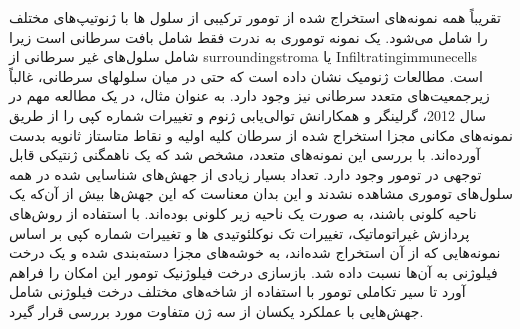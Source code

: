 تقریباً همه نمونه‌های استخراج شده از تومور ترکیبی از سلول ها با ژنوتیپ‌های مختلف را شامل می‌شود. یک نمونه توموری به ندرت فقط شامل بافت سرطانی است زیرا شامل سلول‌های غیر سرطانی از \gls{surroundingstroma}  یا \glspl{Infiltratingimmunecell}  است. مطالعات ژنومیک نشان داده است که حتی در میان سلولهای سرطانی، غالباً زیرجمعیت‌های متعدد سرطانی نیز وجود دارد. به عنوان مثال، در یک مطالعه مهم در سال 2012، گرلینگر و همکارانش \cite{gerlinger2012intratumor} توالی‌یابی ژنوم و تغییرات شماره کپی را از طریق نمونه‌های مکانی مجزا استخراج شده از سرطان کلیه اولیه و نقاط متاستاز ثانویه بدست آورده‌اند. با بررسی  این نمونه‌های متعدد، مشخص شد که یک ناهمگنی ژنتیکی قابل توجهی در تومور وجود دارد. تعداد بسیار زیادی از جهش‌های شناسایی شده در همه سلول‌های توموری مشاهده نشدند و این بدان معناست که این جهش‌ها بیش از آن‌که یک ناحیه کلونی باشند، به صورت یک ناحیه زیر کلونی بوده‌اند. با استفاده از روش‌های پردازش غیراتوماتیک، تغییرات تک نوکلئوتیدی  ها و تغییرات شماره کپی بر اساس نمونه‌هایی که از آن استخراج شده‌اند، به خوشه‌های مجزا دسته‌بندی شده و یک درخت فیلوژنی به آن‌ها نسبت داده شد. بازسازی درخت فیلوژنیک تومور این امکان را فراهم آورد تا سیر تکاملی تومور با استفاده از شاخه‌های مختلف درخت فیلوژنی شامل جهش‌هایی با عملکرد یکسان از سه ژن متفاوت مورد بررسی قرار گیرد. 


